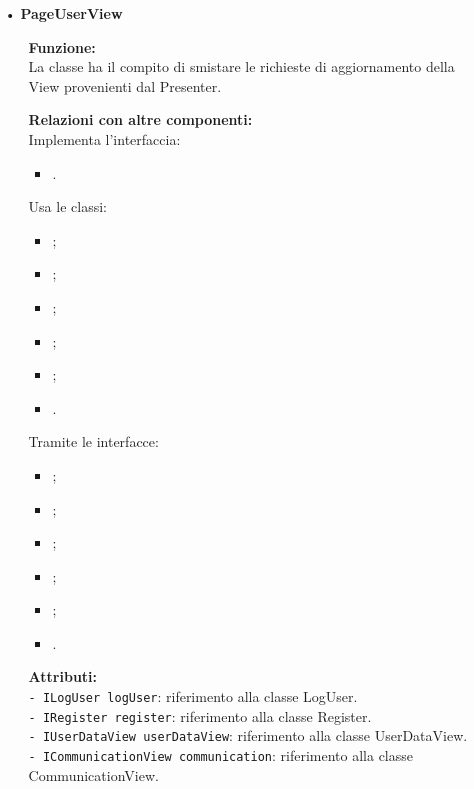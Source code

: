 {\begin{sloppypar}
{\begin{itemize}
\begin{itemize}
		\end{itemize}

		\item[•] \textbf{PageUserView}
		\begin{itemize}
			\item[] \textbf{Funzione:} \\
			La classe ha il compito di smistare le richieste di aggiornamento della View provenienti dal Presenter.
			
			\item[] \textbf{Relazioni con altre componenti:} \\
			Implementa l'interfaccia:
			\begin{itemize}
				\item {}.
			\end{itemize}
			Usa le classi:
			\begin{itemize}
				\item {};
				\item {};
				\item {};
				\item {};
				\item {};
				\item {}.
			\end{itemize}
			Tramite le interfacce:
			\begin{itemize}
				\item {};
				\item {};
				\item {};
				\item {};
				\item {};
				\item {}.
			\end{itemize}
			
			\item[] \textbf{Attributi:}\\
				\texttt{- ILogUser logUser}: riferimento alla classe LogUser.\\
				\texttt{- IRegister register}: riferimento alla classe Register.\\
				\texttt{- IUserDataView userDataView}: riferimento alla classe UserDataView.\\
				\texttt{- ICommunicationView communication}: riferimento alla classe CommunicationView.\\
			

\end{itemize}
\end{itemize}}
\end{sloppypar}}
